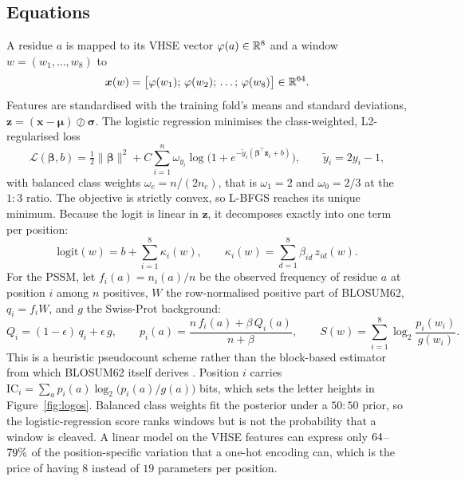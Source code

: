 \subsection{Equations}

A residue $a$ is mapped to its VHSE vector $\varphi(a)\in\mathbb{R}^{8}$ and a window
$w=(w_1,\dots,w_8)$ to
\begin{equation}
\boldsymbol{x}(w)=\bigl[\varphi(w_1);\,\varphi(w_2);\,\dots;\,\varphi(w_8)\bigr]\in\mathbb{R}^{64}.
\label{eq:x}
\end{equation}
Features are standardised with the training fold's means and standard
deviations, $\bm z=(\bm x-\bm\mu)\oslash\bm\sigma$. The logistic regression
minimises the class-weighted, L2-regularised loss
\begin{equation}
\mathcal{L}(\bm\beta,b)=\tfrac12\|\bm\beta\|^2+C\sum_{i=1}^{n}\omega_{y_i}\log\bigl(1+e^{-\tilde y_i(\bm\beta^{\top}\bm z_i+b)}\bigr),\qquad \tilde y_i=2y_i-1,
\label{eq:lr}
\end{equation}
with balanced class weights $\omega_c=n/(2n_c)$, that is $\omega_1=2$ and
$\omega_0=2/3$ at the $1{:}3$ ratio. The objective is strictly convex, so L-BFGS reaches its unique minimum. Because the logit is linear in $\bm z$, it
decomposes exactly into one term per position:
\begin{equation}
\mathrm{logit}(w)=b+\sum_{i=1}^{8}\kappa_i(w),\qquad \kappa_i(w)=\sum_{d=1}^{8}\beta_{id}\,z_{id}(w).
\label{eq:decomp}
\end{equation}
For the PSSM, let $f_i(a)=n_i(a)/n$ be the observed frequency of residue $a$
at position $i$ among $n$ positives, $W$ the row-normalised positive part of
BLOSUM62, $q_i=f_iW$, and $g$ the Swiss-Prot background:
\begin{equation}
Q_i=(1-\epsilon)\,q_i+\epsilon\,g,\qquad p_i(a)=\frac{n\,f_i(a)+\beta\,Q_i(a)}{n+\beta},\qquad S(w)=\sum_{i=1}^{8}\log_2\frac{p_i(w_i)}{g(w_i)}.
\label{eq:pssm}
\end{equation}
This is a heuristic pseudocount scheme rather than the block-based estimator
from which BLOSUM62 itself derives . Position $i$ carries
$\mathrm{IC}_i=\sum_a p_i(a)\log_2\bigl(p_i(a)/g(a)\bigr)$ bits, which sets the letter
heights in Figure~\ref{fig:logos}. Balanced class weights fit the posterior under a $50{:}50$ prior, so the logistic-regression score ranks windows but is not the probability that a window is cleaved. A linear model on the VHSE features can express only $64$--$79\%$ of the position-specific variation that a one-hot encoding can, which is the price of having $8$ instead of $19$ parameters per position.

